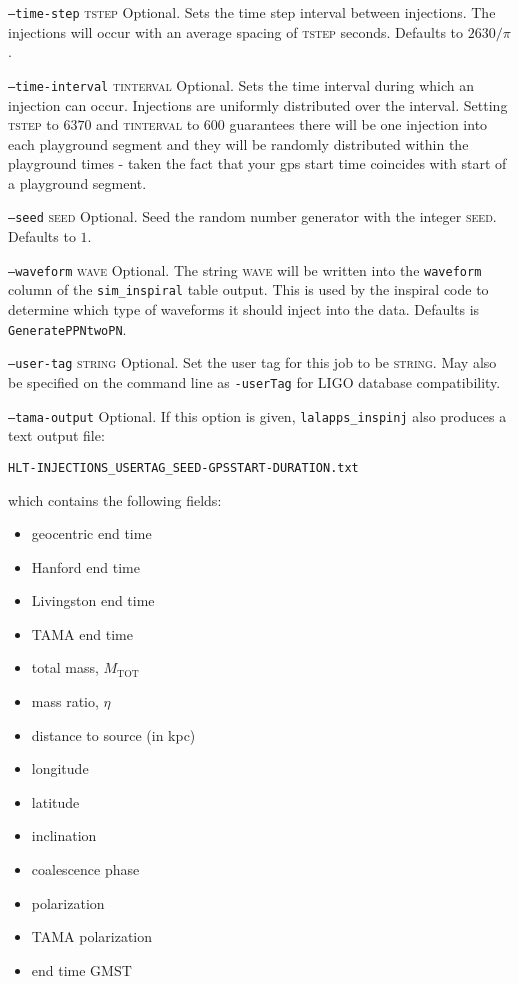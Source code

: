 \begin{entry}
\begin{entry}
\item[\texttt{--time-step} \textsc{tstep}]
Optional. Sets the time step interval between injections. The injections will
occur with an average spacing of \textsc{tstep} seconds. Defaults to 
$2630/\pi$.

\item[\texttt{--time-interval} \textsc{tinterval}]
Optional. Sets the time interval during which an injection can occur. 
Injections are uniformly distributed over the interval.  Setting \textsc{tstep}
to $6370$ and \textsc{tinterval} to 600 guarantees there will be one injection
into each playground segment and they will be randomly distributed within the
playground times - taken the fact that your gps start time coincides with start of a playground segment.

\item[\texttt{--seed} \textsc{seed}]
Optional. Seed the random number generator with the integer \textsc{seed}.
Defaults to $1$.

\item[\texttt{--waveform} \textsc{wave}]
Optional. The string \textsc{wave} will be written into the \texttt{waveform}
column of the \texttt{sim\_inspiral} table output. This is used by the
inspiral code to determine which type of waveforms it should inject into the
data. Defaults is \texttt{GeneratePPNtwoPN}.

\item[\texttt{--user-tag} \textsc{string}] Optional. Set the user tag for this
job to be \textsc{string}. May also be specified on the command line as 
\texttt{-userTag} for LIGO database compatibility.

\item[\texttt{--tama-output}]
Optional.  If this option is given, \verb+lalapps_inspinj+ also produces a 
text output file:
\begin{center}
\begin{verbatim}
HLT-INJECTIONS_USERTAG_SEED-GPSSTART-DURATION.txt
\end{verbatim}
\end{center}
which contains the following fields:

\begin{itemize}
\item geocentric end time
\item Hanford end time
\item Livingston end time
\item TAMA end time
\item total mass, $M_{\mathrm{TOT}}$
\item mass ratio, $\eta$
\item distance to source (in kpc)
\item longitude
\item latitude
\item inclination
\item coalescence phase
\item polarization
\item TAMA polarization
\item end time GMST
\end{itemize}


\end{entry}
\end{entry}
